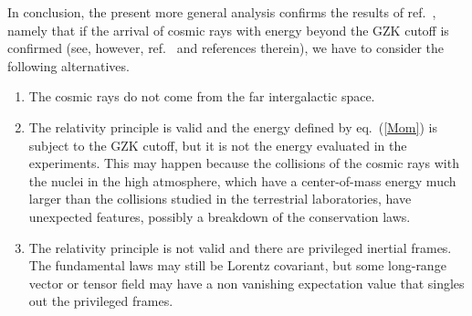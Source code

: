 \documentclass[a4paper,12pt]{article}
\begin{document}
In conclusion, the present more general analysis confirms  the results of ref.\ \cite{Toller}, namely that if the arrival of cosmic rays with energy beyond the GZK cutoff \cite{Takeda} is confirmed (see, however, ref.\ \cite{BW} and references therein), we have to consider the following alternatives.
\renewcommand{\labelenumi}{\Alph{enumi})}
\begin{enumerate}
\item The cosmic rays do not come from the far intergalactic space.
\item The relativity principle is valid and the energy defined by eq.\ (\ref{Mom}) is subject to the GZK cutoff, but it is not the energy evaluated in the experiments. This may happen because the collisions of the cosmic rays with the nuclei in the high atmosphere, which have a center-of-mass energy much larger than the collisions studied in the terrestrial laboratories, have unexpected features, possibly a breakdown of the conservation laws.
\item  The relativity principle is not valid and there are privileged inertial frames. The fundamental laws may still be Lorentz covariant, but some long-range vector or tensor field may have a non vanishing expectation value that singles out the privileged frames.
\end{enumerate}
\end{document}
